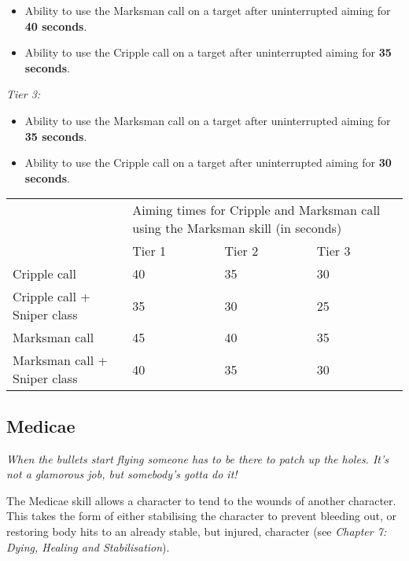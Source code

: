 \begin{itemize}
\item Ability to use the Marksman call on a target after uninterrupted aiming for \textbf{40 seconds}.

\item Ability to use the Cripple call on a target after uninterrupted aiming for \textbf{35 seconds}.

\end{itemize}
\textit{Tier 3:}

\begin{itemize}
\item Ability to use the Marksman call on a target after uninterrupted aiming for \textbf{35 seconds}.

\item Ability to use the Cripple call on a target after uninterrupted aiming for \textbf{30 seconds}.

\end{itemize}

\begin{table}[H]
\begin{tabular}{|l|l|l|l|} \hline 
\multirow{1}{*}{}& \multicolumn{3}{|l|}{Aiming times for Cripple and Marksman call using the Marksman skill (in seconds)} \\
\cline{2-2}\cline{3-3}\cline{4-4} & Tier 1 & Tier 2 & Tier 3 \\
 \hline Cripple call & 40 & 35 & 30 \\
 \hline Cripple call + Sniper class & 35 & 30 & 25 \\
 \hline Marksman call & 45 & 40 & 35 \\
 \hline Marksman call + Sniper class & 40 & 35 & 30 \\
 \hline \end{tabular}

\end{table}

\subsection{Medicae}

\textit{When the bullets start flying someone has to be there to patch up the holes. It's not a glamorous job, but somebody's gotta do it!}

The Medicae skill allows a character to tend to the wounds of another character. This takes the form of either stabilising the character to prevent bleeding out, or restoring body hits to an already stable, but injured, character (see \textit{Chapter 7: Dying, Healing and Stabilisation}).


